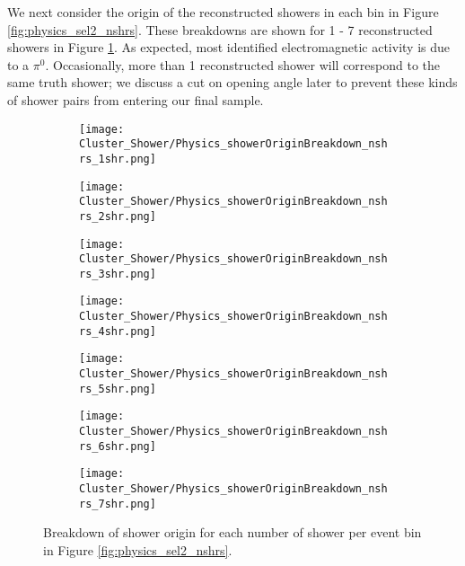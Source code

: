 \par We next consider the origin of the reconstructed showers in each bin in Figure \ref{fig:physics_sel2_nshrs}. These breakdowns are shown for 1 - 7 reconstructed showers in Figure \ref{fig:physics_sel2_nshr_background_breakdown}. As expected, most identified electromagnetic activity is due to a $\pi^0$. Occasionally, more than 1 reconstructed shower will correspond to the same truth shower; we discuss a cut on opening angle later to prevent these kinds of shower pairs from entering our final sample. 
\begin{figure}[t!]
\centering
  \begin{subfigure}[t]{0.25\textwidth}
    \centering
\texttt{[image: Cluster\_Shower/Physics\_showerOriginBreakdown\_nshrs\_1shr.png]}
  \caption{ }
  \end{subfigure} 
  \hspace{4mm}
  \begin{subfigure}[t]{0.25\textwidth}
    \centering
\texttt{[image: Cluster\_Shower/Physics\_showerOriginBreakdown\_nshrs\_2shr.png]}
  \caption{ }
  \end{subfigure} 
  \hspace{4mm}
  \begin{subfigure}[t]{0.25\textwidth}
    \centering
\texttt{[image: Cluster\_Shower/Physics\_showerOriginBreakdown\_nshrs\_3shr.png]}
  \caption{ }
  \end{subfigure} 
  \hspace{4mm}
  \begin{subfigure}[t]{0.25\textwidth}
    \centering
\texttt{[image: Cluster\_Shower/Physics\_showerOriginBreakdown\_nshrs\_4shr.png]}
  \caption{ }
  \end{subfigure} 
  \hspace{4mm}
  \begin{subfigure}[t]{0.25\textwidth}
    \centering
\texttt{[image: Cluster\_Shower/Physics\_showerOriginBreakdown\_nshrs\_5shr.png]}
  \caption{ }
  \end{subfigure} 
  \hspace{4mm}
  \begin{subfigure}[t]{0.25\textwidth}
    \centering
\texttt{[image: Cluster\_Shower/Physics\_showerOriginBreakdown\_nshrs\_6shr.png]}
  \caption{ }
  \end{subfigure} 
  \hspace{4mm}
  \begin{subfigure}[t]{0.25\textwidth}
    \centering
\texttt{[image: Cluster\_Shower/Physics\_showerOriginBreakdown\_nshrs\_7shr.png]}
  \caption{ }
  \end{subfigure} 
\caption{ Breakdown of shower origin for each number of shower per event bin in Figure \ref{fig:physics_sel2_nshrs}. }
\label{fig:physics_sel2_nshr_background_breakdown}
\end{figure}


